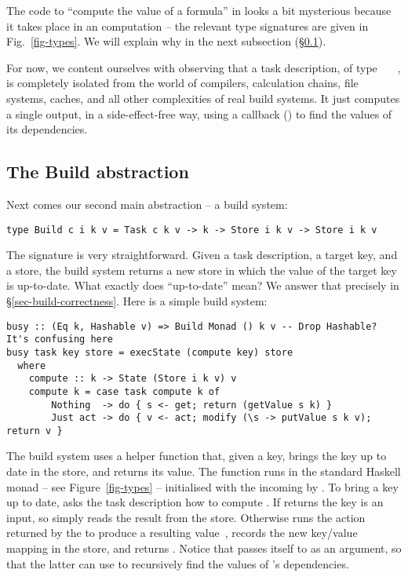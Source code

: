 The code to ``compute the value of a formula'' in  looks a bit mysterious
because it takes place in an  computation \cite{mcbride2008applicative}
-- the relevant type signatures are given in Fig.~\ref{fig-types}.   We will
explain why in the next subsection (\S\ref{sec-general-build}).

For now, we content ourselves with observing that a task description,
of type ~~~, is completely isolated from the world of
compilers, calculation chains, file systems, caches, and all other
complexities of real build systems.  It just computes a single output, in
a side-effect-free way, using a callback () to find the values
of its dependencies.

\subsection{The Build abstraction}\label{sec-general-build}

Next comes our second main abstraction -- a build system:
\vspace{1mm}
\begin{verbatim}
type Build c i k v = Task c k v -> k -> Store i k v -> Store i k v
\end{verbatim}
\vspace{1mm}
The signature is very straightforward.  Given a task description, a target key,
and a store, the build system returns a new store in which the value of the
target key is up-to-date. What exactly does ``up-to-date'' mean?  We answer
that precisely in \S\ref{sec-build-correctness}. Here is a simple build system:

\vspace{1mm}
\begin{verbatim}
busy :: (Eq k, Hashable v) => Build Monad () k v -- Drop Hashable? It's confusing here
busy task key store = execState (compute key) store
  where
    compute :: k -> State (Store i k v) v
    compute k = case task compute k of
        Nothing  -> do { s <- get; return (getValue s k) }
        Just act -> do { v <- act; modify (\s -> putValue s k v); return v }
\end{verbatim}
\vspace{1mm}

\noindent
The  build system uses a helper function
 that, given a key, brings the key up to date in the store, and returns its value.
The function  runs in the standard Haskell  monad -- see
Figure~\ref{fig-types} -- initialised with the incoming  by .
To bring a key up to date,  asks the task description  how
to compute .
If  returns  the key is an input, so  simply reads
the result from the store.
Otherwise  runs the action 
returned by the  to produce a resulting value~, records
the new key/value mapping in the store, and returns .
Notice that  passes itself to  as an argument,
so that the latter can use  to recursively find the
values of 's dependencies.

